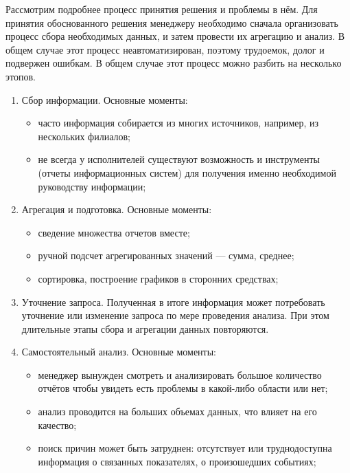Рассмотрим подробнее процесс принятия решения и проблемы в нём. Для принятия
обоснованного решения менеджеру необходимо сначала организовать процесс
сбора необходимых данных, и затем провести их агрегацию и анализ.
В общем случае этот процесс неавтоматизирован, поэтому трудоемок, долог
и подвержен ошибкам. В общем случае этот процесс можно разбить на несколько
этопов.
\begin{enumerate}

  \item Сбор информации. Основные моменты:
    \begin{itemize}
      \item часто информация собирается из многих источников, например,
        из нескольких филиалов;
      \item не всегда у исполнителей существуют возможность и инструменты
        (отчеты информационных систем) для получения именно необходимой
        руководству информации;
    \end{itemize}

  \item Агрегация и подготовка. Основные моменты:
    \begin{itemize}
      \item сведение множества отчетов вместе;
      \item ручной подсчет агрегированных значений --- сумма, среднее;
      \item сортировка, построение графиков в сторонних средствах;
    \end{itemize}


  \item Уточнение запроса. Полученная в итоге информация может потребовать
    уточнение или изменение запроса по мере проведения анализа.
    При этом длительные этапы сбора и агрегации данных повторяются.

  \item Самостоятельный анализ. Основные моменты:
    \begin{itemize}
      \item менеджер вынужден смотреть и анализировать большое количество
        отчётов чтобы увидеть есть проблемы в какой-либо области или нет;
      \item анализ проводится на больших объемах данных, что влияет на его качество;
      \item поиск причин может быть затруднен: отсутствует или труднодоступна
        информация о связанных показателях, о произошедших событиях;
    \end{itemize}

\end{enumerate}


